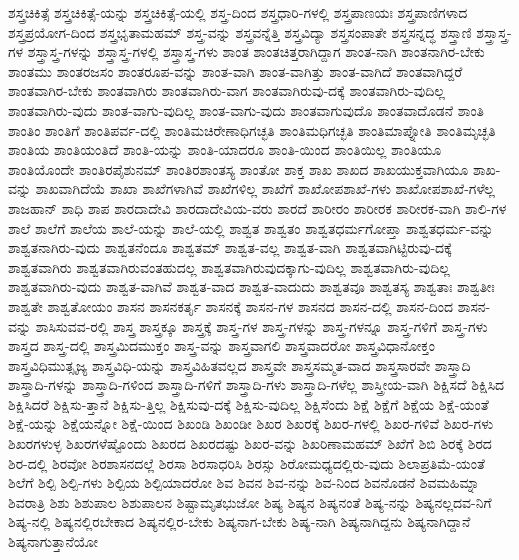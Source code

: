 {ಶಸ್ತ್ರಚಿಕಿತ್ಸೆ
ಶಸ್ತ್ರಚಿಕಿತ್ಸೆ-ಯನ್ನು
ಶಸ್ತ್ರಚಿಕಿತ್ಸೆ-ಯಲ್ಲಿ
ಶಸ್ತ್ರ-ದಿಂದ
ಶಸ್ತ್ರಧಾರಿ-ಗಳಲ್ಲಿ
ಶಸ್ತ್ರಪಾಣಯಃ
ಶಸ್ತ್ರಪಾಣಿಗಳಾದ
ಶಸ್ತ್ರಪ್ರಯೋಗ-ದಿಂದ
ಶಸ್ತ್ರಭೃತಾಮಹಮ್
ಶಸ್ತ್ರ-ವನ್ನು
ಶಸ್ತ್ರವನ್ನೆತ್ತಿ
ಶಸ್ತ್ರವಿದ್ಯಾ
ಶಸ್ತ್ರಸಂಪಾತೇ
ಶಸ್ತ್ರಸನ್ನದ್ಧ
ಶಸ್ತ್ರಾಣಿ
ಶಸ್ತ್ರಾಸ್ತ್ರ-ಗಳ
ಶಸ್ತ್ರಾಸ್ತ್ರ-ಗಳನ್ನು
ಶಸ್ತ್ರಾಸ್ತ್ರ-ಗಳಲ್ಲಿ
ಶಸ್ತ್ರಾಸ್ತ್ರ-ಗಳು
ಶಾಂತ
ಶಾಂತಚಿತ್ತರಾಗಿದ್ದಾಗ
ಶಾಂತ-ನಾಗಿ
ಶಾಂತನಾಗಿರ-ಬೇಕು
ಶಾಂತಮು
ಶಾಂತರಜಸಂ
ಶಾಂತರೂಪ-ವನ್ನು
ಶಾಂತ-ವಾಗಿ
ಶಾಂತ-ವಾಗಿತ್ತು
ಶಾಂತ-ವಾಗಿದೆ
ಶಾಂತವಾಗಿದ್ದರೆ
ಶಾಂತವಾಗಿರ-ಬೇಕು
ಶಾಂತವಾಗಿರು
ಶಾಂತವಾಗಿರು-ವಾಗ
ಶಾಂತವಾಗಿರುವು-ದಕ್ಕೆ
ಶಾಂತವಾಗಿರು-ವುದಿಲ್ಲ
ಶಾಂತವಾಗಿರು-ವುದು
ಶಾಂತ-ವಾಗು-ವುದಿಲ್ಲ
ಶಾಂತ-ವಾಗು-ವುದು
ಶಾಂತವಾಗುವುದೊ
ಶಾಂತವಾದೊಡನೆ
ಶಾಂತಿ
ಶಾಂತಿಂ
ಶಾಂತಿಗೆ
ಶಾಂತಿಪರ್ವ-ದಲ್ಲಿ
ಶಾಂತಿಮಚಿರೇಣಾಧಿಗಚ್ಛತಿ
ಶಾಂತಿಮಧಿಗಚ್ಛತಿ
ಶಾಂತಿಮಾಪ್ನೋತಿ
ಶಾಂತಿಮೃಚ್ಛತಿ
ಶಾಂತಿಯ
ಶಾಂತಿಯಂತಿದೆ
ಶಾಂತಿ-ಯನ್ನು
ಶಾಂತಿ-ಯಾದರೂ
ಶಾಂತಿ-ಯಿಂದ
ಶಾಂತಿಯಿಲ್ಲ
ಶಾಂತಿಯೂ
ಶಾಂತಿಯೊಂದೇ
ಶಾಂತಿರಪೈಶುನಮ್
ಶಾಂತಿರಶಾಂತಸ್ಯ
ಶಾಂತೋ
ಶಾಕ್ತ
ಶಾಖ
ಶಾಖದ
ಶಾಖಯುಕ್ತವಾಗಿಯೂ
ಶಾಖ-ವನ್ನು
ಶಾಖವಾಗಿದೆಯೆ
ಶಾಖಾ
ಶಾಖೆಗಳಾಗಿವೆ
ಶಾಖೆಗಳಿಲ್ಲ
ಶಾಖೆಗೆ
ಶಾಖೋಪಶಾಖೆ-ಗಳು
ಶಾಖೋಪಶಾಖೆ-ಗಳೆಲ್ಲ
ಶಾಜಹಾನ್
ಶಾಧಿ
ಶಾಪ
ಶಾರದಾದೇವಿ
ಶಾರದಾದೇವಿಯ-ವರು
ಶಾರದೆ
ಶಾರೀರಂ
ಶಾರೀರಕ
ಶಾರೀರಕ-ವಾಗಿ
ಶಾಲಿ-ಗಳ
ಶಾಲೆ
ಶಾಲೆಗೆ
ಶಾಲೆಯ
ಶಾಲೆ-ಯನ್ನು
ಶಾಲೆ-ಯಲ್ಲಿ
ಶಾಶ್ವತ
ಶಾಶ್ವತಂ
ಶಾಶ್ವತಧರ್ಮಗೋಪ್ತಾ
ಶಾಶ್ವತಧರ್ಮ-ವನ್ನು
ಶಾಶ್ವತನಾಗಿರು-ವುದು
ಶಾಶ್ವತನೆಂದೂ
ಶಾಶ್ವತಮ್
ಶಾಶ್ವತ-ವಲ್ಲ
ಶಾಶ್ವತ-ವಾಗಿ
ಶಾಶ್ವತವಾಗಿಟ್ಟಿರುವು-ದಕ್ಕೆ
ಶಾಶ್ವತವಾಗಿರು
ಶಾಶ್ವತವಾಗಿರುವಂತಹುದಲ್ಲ
ಶಾಶ್ವತವಾಗಿರುವುದಕ್ಕಾಗು-ವುದಿಲ್ಲ
ಶಾಶ್ವತವಾಗಿರು-ವುದಿಲ್ಲ
ಶಾಶ್ವತವಾಗಿರು-ವುದು
ಶಾಶ್ವತ-ವಾಗಿವೆ
ಶಾಶ್ವತ-ವಾದ
ಶಾಶ್ವತ-ವಾದುದು
ಶಾಶ್ವತವೂ
ಶಾಶ್ವತಸ್ಯ
ಶಾಶ್ವತಾಃ
ಶಾಶ್ವತೀಃ
ಶಾಶ್ವತೇ
ಶಾಶ್ವತೋಯಂ
ಶಾಸನ
ಶಾಸನಕರ್ತೃ
ಶಾಸನಕ್ಕೆ
ಶಾಸನ-ಗಳ
ಶಾಸನದ
ಶಾಸನ-ದಲ್ಲಿ
ಶಾಸನ-ದಿಂದ
ಶಾಸನ-ವನ್ನು
ಶಾಸಿಸುವವ-ರಲ್ಲಿ
ಶಾಸ್ತ್ರ
ಶಾಸ್ತ್ರಕ್ಕೂ
ಶಾಸ್ತ್ರಕ್ಕೆ
ಶಾಸ್ತ್ರ-ಗಳ
ಶಾಸ್ತ್ರ-ಗಳನ್ನು
ಶಾಸ್ತ್ರ-ಗಳನ್ನೂ
ಶಾಸ್ತ್ರ-ಗಳಿಗೆ
ಶಾಸ್ತ್ರ-ಗಳು
ಶಾಸ್ತ್ರದ
ಶಾಸ್ತ್ರ-ದಲ್ಲಿ
ಶಾಸ್ತ್ರಮಿದಮುಕ್ತಂ
ಶಾಸ್ತ್ರ-ವನ್ನು
ಶಾಸ್ತ್ರವಾಗಲಿ
ಶಾಸ್ತ್ರವಾದರೋ
ಶಾಸ್ತ್ರವಿಧಾನೋಕ್ತಂ
ಶಾಸ್ತ್ರವಿಧಿಮುತ್ಸೃಜ್ಯ
ಶಾಸ್ತ್ರವಿಧಿ-ಯನ್ನು
ಶಾಸ್ತ್ರವಿಹಿತವಲ್ಲದ
ಶಾಸ್ತ್ರವೇ
ಶಾಸ್ತ್ರಸಮ್ಮತ-ವಾದ
ಶಾಸ್ತ್ರಸಾರವೇ
ಶಾಸ್ತ್ರಾದಿ
ಶಾಸ್ತ್ರಾದಿ-ಗಳನ್ನು
ಶಾಸ್ತ್ರಾದಿ-ಗಳಿಂದ
ಶಾಸ್ತ್ರಾದಿ-ಗಳಿಗೆ
ಶಾಸ್ತ್ರಾದಿ-ಗಳು
ಶಾಸ್ತ್ರಾದಿ-ಗಳೆಲ್ಲ
ಶಾಸ್ತ್ರೀಯ-ವಾಗಿ
ಶಿಕ್ಷಿಸದೆ
ಶಿಕ್ಷಿಸಿದ
ಶಿಕ್ಷಿಸಿದರೆ
ಶಿಕ್ಷಿಸು-ತ್ತಾನೆ
ಶಿಕ್ಷಿಸು-ತ್ತಿಲ್ಲ
ಶಿಕ್ಷಿಸುವು-ದಕ್ಕೆ
ಶಿಕ್ಷಿಸು-ವುದಿಲ್ಲ
ಶಿಕ್ಷಿಸೆಂದು
ಶಿಕ್ಷೆ
ಶಿಕ್ಷೆಗೆ
ಶಿಕ್ಷೆಯ
ಶಿಕ್ಷೆ-ಯಂತೆ
ಶಿಕ್ಷೆ-ಯನ್ನು
ಶಿಕ್ಷೆಯನ್ನೋ
ಶಿಕ್ಷೆ-ಯಿಂದ
ಶಿಖಂಡಿ
ಶಿಖಂಡೀ
ಶಿಖರ
ಶಿಖರಕ್ಕೆ
ಶಿಖರ-ಗಳಲ್ಲಿ
ಶಿಖರ-ಗಳಿವೆ
ಶಿಖರ-ಗಳು
ಶಿಖರಗಳುಳ್ಳ
ಶಿಖರಗಳೆಷ್ಟೊಂದು
ಶಿಖರದ
ಶಿಖರದಷ್ಟು
ಶಿಖರ-ವನ್ನು
ಶಿಖರಿಣಾಮಹಮ್
ಶಿಖೆಗೆ
ಶಿಬಿ
ಶಿರಕ್ಕೆ
ಶಿರದ
ಶಿರ-ದಲ್ಲಿ
ಶಿರವೋ
ಶಿರಶಾಸನದಲ್ಲೆ
ಶಿರಸಾ
ಶಿರಸಾಧರಿಸಿ
ಶಿರಸ್ಸು
ಶಿರೋಮಧ್ಯದಲ್ಲಿರು-ವುದು
ಶಿಲಾಪ್ರತಿಮೆ-ಯಂತೆ
ಶಿಲೆಗೆ
ಶಿಲ್ಪಿ
ಶಿಲ್ಪಿ-ಗಳು
ಶಿಲ್ಪಿಯ
ಶಿಲ್ಪಿಯಾದರೋ
ಶಿವ
ಶಿವನ
ಶಿವ-ನನ್ನು
ಶಿವ-ನಿಂದ
ಶಿವನೊಡನೆ
ಶಿವಮಹಿಮ್ನಾ
ಶಿವರಾತ್ರಿ
ಶಿಶು
ಶಿಶುಪಾಲ
ಶಿಶುಪಾಲನ
ಶಿಷ್ಟಾಮೃತಭುಜೋ
ಶಿಷ್ಯ
ಶಿಷ್ಯನ
ಶಿಷ್ಯನಂತೆ
ಶಿಷ್ಯ-ನನ್ನು
ಶಿಷ್ಯನಲ್ಲದವ-ನಿಗೆ
ಶಿಷ್ಯ-ನಲ್ಲಿ
ಶಿಷ್ಯನಲ್ಲಿರಬೇಕಾದ
ಶಿಷ್ಯನಲ್ಲಿರ-ಬೇಕು
ಶಿಷ್ಯನಾಗ-ಬೇಕು
ಶಿಷ್ಯ-ನಾಗಿ
ಶಿಷ್ಯನಾಗಿದ್ದನು
ಶಿಷ್ಯನಾಗಿದ್ದಾನೆ
ಶಿಷ್ಯನಾಗುತ್ತಾನೆಯೋ
}
